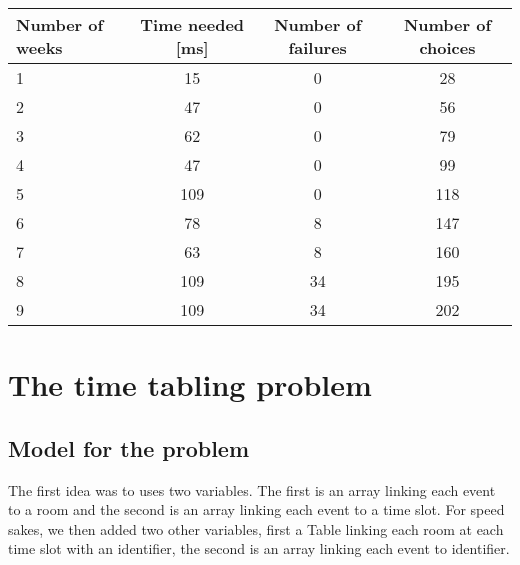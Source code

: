 \documentclass{eplDoc}
\begin{document}
\begin{center}
		\begin{tabular}{|l|c|c|c|}
			\hline
			Number of weeks & Time needed [ms] & Number of failures & Number of choices \\ 
			\hline
			1 & 15 & 0 & 28 \\ 
			2 & 47 & 0 & 56 \\ 
			3 & 62 & 0 & 79 \\ 
			4 & 47 & 0 & 99 \\ 
			5 & 109 & 0 & 118 \\ 
			6 & 78 & 8 & 147 \\ 
			7 & 63 & 8 & 160 \\ 
			8 & 109 & 34 & 195 \\ 
			9 & 109 & 34 & 202 \\ 
			\hline
		\end{tabular}
\end{center}



\section{The time tabling problem} 

\subsection{Model for the problem}
The first idea was to uses two variables.  The first is an array linking each event to a room and the second is an array linking each event to a time slot.  For speed sakes, we then added two other variables, first a Table linking each room at each time slot with an identifier, the second is an array linking each event to identifier. 
\end{document}
